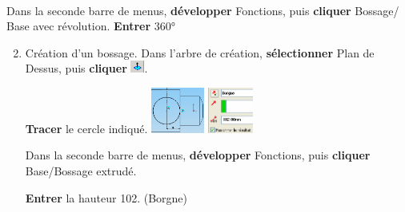 ~\

Dans la seconde barre de menus, \textbf{développer} Fonctions, puis \textbf{cliquer} Bossage/ Base avec révolution. 
\textbf{Entrer} 360° 

\begin{enumerate}
\setcounter{enumi}{1}
 \item  Création d'un bossage. 
Dans l'arbre de création, \textbf{sélectionner} Plan de Dessus, puis \textbf{cliquer} \includegraphics[height=0.4cm]{img/SW-020.png}.

\textbf{Tracer} le cercle indiqué.
 \includegraphics[height=1.5cm]{img/SW-021.png} 
 \includegraphics[height=1.5cm]{img/SW-022.png}

Dans la seconde barre de menus, \textbf{développer} Fonctions, puis \textbf{cliquer} Base/Bossage extrudé.

\textbf{Entrer} la hauteur 102. (Borgne)
\end{enumerate}


